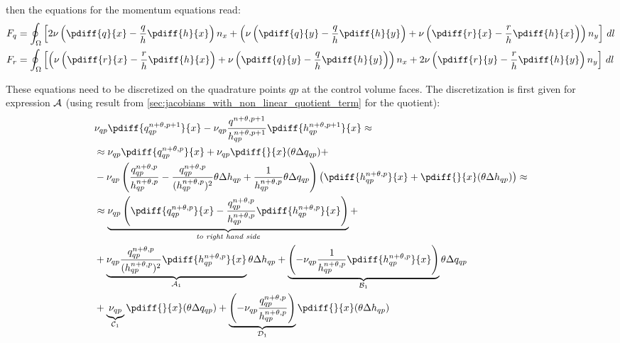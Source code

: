 then the equations for the momentum equations read:
\begin{align}
    F_q
    & = \oint_{\Omega}
    \left[ 2 \nu \left( \pdiff{q}{x} - \frac{q}{h}\pdiff{h}{x}\right)  n_x
    + \left(\nu \left( \pdiff{q}{y} - \frac{q}{h}\pdiff{h}{y} \right) +
    \nu \left( \pdiff{r}{x} - \frac{r}{h}\pdiff{h}{x} \right) \right)n_y \right] \, dl
    \\
    F_r
    & = \oint_{\Omega}
    \left[ \left(\nu \left( \pdiff{r}{x} - \frac{r}{h}\pdiff{h}{x} \right)
    + \nu \left( \pdiff{q}{y} - \frac{q}{h}\pdiff{h}{y} \right) \right)n_x
    + 2 \nu \left( \pdiff{r}{y} - \frac{r}{h}\pdiff{h}{y} \right) n_y \right] \, dl
\end{align}

These equations need to be  discretized on the quadrature points $qp$ at the control volume faces.
The discretization is first  given for expression $\cal{A}$ (using result from \autoref{sec:jacobians_with_non_linear_quotient_term} for the quotient):
\begin{align}
     & \nu_{qp} \pdiff{q^{n+\theta, p+1}_{qp}}{x}  -
    \nu_{qp} \frac{q^{n+\theta, p+1}}{h^{n+\theta, p+1}_{qp}}\pdiff{ h^{n+\theta, p+1}_{qp}}{x} \approx
    \\*
    & \approx
    \nu_{qp} \pdiff{q^{n+\theta,p}_{qp}}{x} + \nu_{qp} \pdiff{}{x}(\theta \Delta q_{qp}) +
    \nonumber \\
    &- \nu_{qp} \left(
    \frac{q^{n+\theta,p}_{qp}}{h^{n+\theta,p}_{qp}} - \frac{q^{n+\theta,p}_{qp}}{(h^{n+\theta,p}_{qp})^2} \theta \Delta h_{qp} +
    \frac{1}{h^{n+\theta,p}_{qp}} \theta \Delta q_{qp}
    \right)\left(  \pdiff{h^{n+\theta,p}_{qp}}{x} + \pdiff{}{x}(\theta \Delta h_{qp}) \right) \approx
    \\
    & \approx
    \underbrace{\nu_{qp} \left( \pdiff{q^{n+\theta,p}_{qp}}{x} - \frac{q^{n+\theta,p}_{qp}}{h^{n+\theta,p}_{qp}} \pdiff{h^{n+\theta,p}_{qp}}{x} \right)}_{\textit {to right hand side}} +
    \\*
& + \underbrace{\nu_{qp}  \frac{q^{n+\theta,p}_{qp}}{(h^{n+\theta,p}_{qp})^2} \pdiff{h^{n+\theta,p}_{qp}}{x}}_{{\cal{A}}_1} \theta \Delta h_{qp}
+ \underbrace{\left(- \nu_{qp} \frac{1}{h^{n+\theta,p}_{qp}}  \pdiff{h^{n+\theta,p}_{qp}}{x}\right)}_{{\cal{B}}_1} \theta \Delta q_{qp}
    \\*
    & +
    \underbrace{\nu_{qp}}_{{\cal{C}}_1} \pdiff{}{x}(\theta \Delta q_{qp}) +
    \underbrace{\left(-\nu_{qp} \frac{q^{n+\theta,p}_{qp}}{h^{n+\theta,p}_{qp}}\right)}_{{\cal{D}}_1}
     \pdiff{}{x}(\theta \Delta h_{qp})
\end{align}
